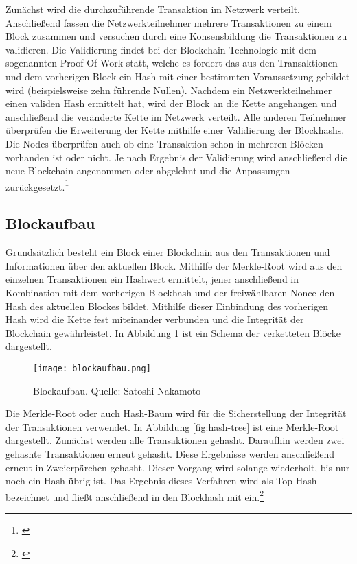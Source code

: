 Zunächst wird die durchzuführende Transaktion im Netzwerk verteilt. Anschließend fassen die Netzwerkteilnehmer mehrere Transaktionen zu einem Block zusammen und versuchen durch eine Konsensbildung die Transaktionen zu validieren. Die Validierung findet bei der Blockchain-Technologie mit dem sogenannten Proof-Of-Work statt, welche es fordert das aus den Transaktionen und dem vorherigen Block ein Hash mit einer bestimmten Voraussetzung gebildet wird (beispielsweise zehn führende Nullen). Nachdem ein Netzwerkteilnehmer einen validen Hash ermittelt hat, wird der Block an die Kette angehangen und anschließend die veränderte Kette im Netzwerk verteilt. Alle anderen Teilnehmer überprüfen die Erweiterung der Kette mithilfe einer Validierung der Blockhashs. Die Nodes überprüfen auch ob eine Transaktion schon in mehreren Blöcken vorhanden ist oder nicht. Je nach Ergebnis der Validierung wird anschließend die neue Blockchain angenommen oder abgelehnt und die Anpassungen zurückgesetzt.\footnote{\cite[S.~2-4]{SatoshiNakamoto.}}


\subsection{Blockaufbau}
\label{subsec:blockaufbau}
Grundsätzlich besteht ein Block einer Blockchain aus den Transaktionen und Informationen über den aktuellen Block. Mithilfe der Merkle-Root wird aus den einzelnen Transaktionen ein Hashwert ermittelt, jener anschließend in Kombination mit dem vorherigen Blockhash und der freiwählbaren Nonce den Hash des aktuellen Blockes bildet. Mithilfe dieser Einbindung des vorherigen Hash wird die Kette fest miteinander verbunden und die Integrität der Blockchain gewährleistet. In Abbildung \ref{fig:blockaufbau} ist ein Schema der verketteten Blöcke dargestellt.

\begin{figure}[!h]
	\texttt{[image: blockaufbau.png]}
	\caption{Blockaufbau. Quelle: Satoshi Nakamoto}
	\label{fig:blockaufbau}
\end{figure}

Die Merkle-Root oder auch Hash-Baum wird für die Sicherstellung der Integrität der Transaktionen verwendet. In Abbildung \ref{fig:hash-tree} ist eine Merkle-Root dargestellt. Zunächst werden alle Transaktionen gehasht. Daraufhin werden zwei gehashte Transaktionen erneut gehasht. Diese Ergebnisse werden anschließend erneut in Zweierpärchen gehasht. Dieser Vorgang wird solange wiederholt, bis nur noch ein Hash übrig ist. Das Ergebnis dieses Verfahren wird als Top-Hash bezeichnet und fließt anschließend in den Blockhash mit ein.\footnote{\cite[S.~4]{SatoshiNakamoto.}}

